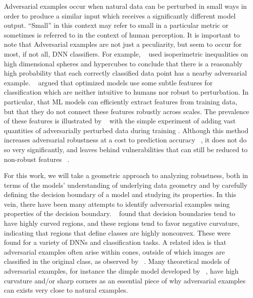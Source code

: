 Adversarial examples occur when natural data can be perturbed in small
ways in order to produce a similar input which receives a
significantly different model output. ``Small'' in this context may
refer to small in a particular metric or sometimes is referred to in
the context of human perception. It is important to note that Adversarial
examples are not just a peculiarity, but seem to occur for most, if
not all, DNN  classifiers. For example, ~\citet{inevitable2018} used
isoperimetric inequalities on high dimensional spheres and hypercubes
to conclude that there is a reasonably high probability that each
correctly classified data point has a nearby adversarial
example. ~\citet{ilyas2019adversarial} argued that optimized models use
some subtle features for classification which are neither intuitive to
humans nor robust to perturbation. In particular, that ML models can
efficiently extract features from training data, but that they do not
connect these features robustly across scales. The prevalence of these
features is illustrated by ~\citet{madry2018towards} with the simple experiment of adding vast
quantities of adversarially perturbed data during training
. Although this method increases
adversarial robustness at a cost to prediction accuracy ~\citep{tsipras2018robustness}, it does not
do so very significantly, and leaves behind vulnerabilities that can
still be reduced to non-robust features ~\citep{inevitable2018}. 


For this work, we will take a geometric approach to analyzing 
robustness, both in terms of the models' understanding of underlying
data geometry and by carefully defining the decision boundary of a
model and studying its properties. In this vein, there have been many
attempts to identify adversarial examples using properties of the
decision boundary.  ~\citet{Fawzi2018empirical} found that decision
boundaries tend to have highly curved regions, and these regions tend
to favor negative curvature, indicating that regions that define
classes are highly nonconvex. These were found for a variety of DNNs
and classification  tasks. 
A related idea is that adversarial examples often arise within cones, outside of which images are classified in the original class, as observed by ~\citet{roth19aodds}. Many theoretical models of adversarial examples, for instance the dimple model developed by ~\citet{shamir2021}, have high curvature and/or sharp corners as an essential piece of why adversarial examples can exists very close to natural examples.


